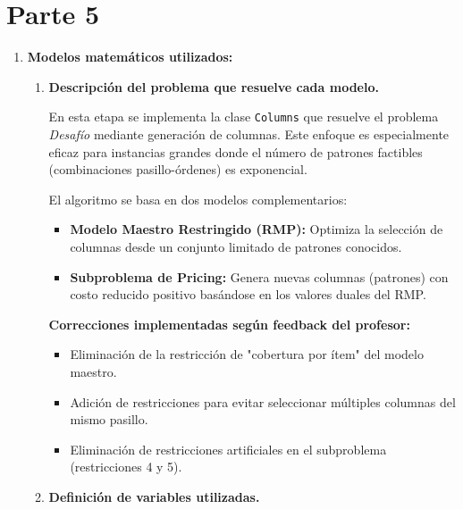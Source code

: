 \documentclass[a4paper,12pt]{article}
\begin{document}
\clearpage

\section{Parte 5}

\begin{enumerate}[label=(\alph*), leftmargin=2em]
    \item \textbf{Modelos matemáticos utilizados:}
    \begin{enumerate}[label=\roman*., leftmargin=0.2em]
    
        \item \textbf{Descripción del problema que resuelve cada modelo.}
        
            En esta etapa se implementa la clase \texttt{Columns} que resuelve el problema \textit{Desafío} mediante generación de columnas. Este enfoque es especialmente eficaz para instancias grandes donde el número de patrones factibles (combinaciones pasillo-órdenes) es exponencial.

            El algoritmo se basa en dos modelos complementarios:
            \begin{itemize}
                \item \textbf{Modelo Maestro Restringido (RMP):} Optimiza la selección de columnas desde un conjunto limitado de patrones conocidos.
                \item \textbf{Subproblema de Pricing:} Genera nuevas columnas (patrones) con costo reducido positivo basándose en los valores duales del RMP.
            \end{itemize}

            \textbf{Correcciones implementadas según feedback del profesor:}
            \begin{itemize}
                \item Eliminación de la restricción de "cobertura por ítem" del modelo maestro.
                \item Adición de restricciones para evitar seleccionar múltiples columnas del mismo pasillo.
                \item Eliminación de restricciones artificiales en el subproblema (restricciones 4 y 5).
            \end{itemize}

        \item \textbf{Definición de variables utilizadas.}


\end{enumerate}
\end{enumerate}
\end{document}
